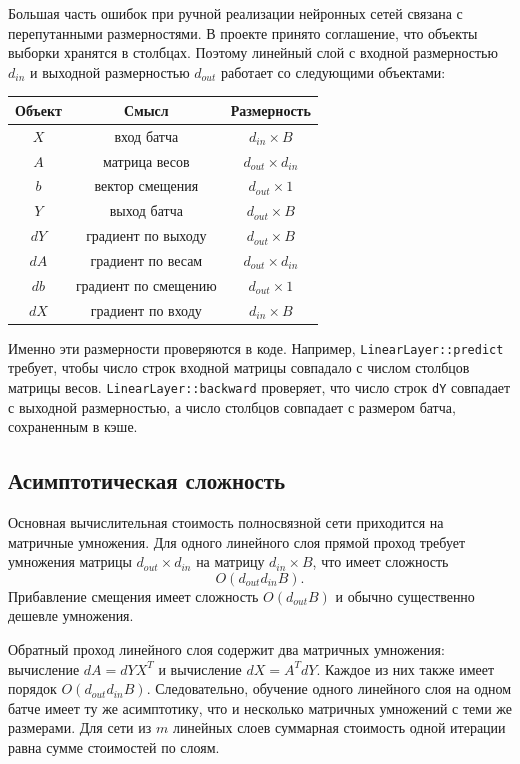 \documentclass{article}
\begin{document}
Большая часть ошибок при ручной реализации нейронных сетей связана с
перепутанными размерностями. В проекте принято соглашение, что объекты
выборки хранятся в столбцах. Поэтому линейный слой с входной
размерностью $d_{in}$ и выходной размерностью $d_{out}$ работает со
следующими объектами:
\begin{center}
\begin{tabular}{|c|c|c|}
\hline
Объект & Смысл & Размерность \\
\hline
$X$ & вход батча & $d_{in} \times B$ \\
$A$ & матрица весов & $d_{out} \times d_{in}$ \\
$b$ & вектор смещения & $d_{out} \times 1$ \\
$Y$ & выход батча & $d_{out} \times B$ \\
$dY$ & градиент по выходу & $d_{out} \times B$ \\
$dA$ & градиент по весам & $d_{out} \times d_{in}$ \\
$db$ & градиент по смещению & $d_{out} \times 1$ \\
$dX$ & градиент по входу & $d_{in} \times B$ \\
\hline
\end{tabular}
\end{center}
Именно эти размерности проверяются в коде. Например,
\texttt{LinearLayer::predict} требует, чтобы число строк входной
матрицы совпадало с числом столбцов матрицы весов.
\texttt{LinearLayer::backward} проверяет, что число строк \texttt{dY}
совпадает с выходной размерностью, а число столбцов совпадает с
размером батча, сохраненным в кэше.

\subsection{Асимптотическая сложность}

Основная вычислительная стоимость полносвязной сети приходится на
матричные умножения. Для одного линейного слоя прямой проход требует
умножения матрицы $d_{out} \times d_{in}$ на матрицу $d_{in} \times
B$, что имеет сложность
\[
    O(d_{out} d_{in} B).
\]
Прибавление смещения имеет сложность $O(d_{out}B)$ и обычно
существенно дешевле умножения.

Обратный проход линейного слоя содержит два матричных умножения:
вычисление $dA = dY X^T$ и вычисление $dX = A^T dY$. Каждое из них
также имеет порядок $O(d_{out} d_{in} B)$. Следовательно, обучение
одного линейного слоя на одном батче имеет ту же асимптотику, что и
несколько матричных умножений с теми же размерами. Для сети из $m$
линейных слоев суммарная стоимость одной итерации равна сумме
стоимостей по слоям.
\end{document}
